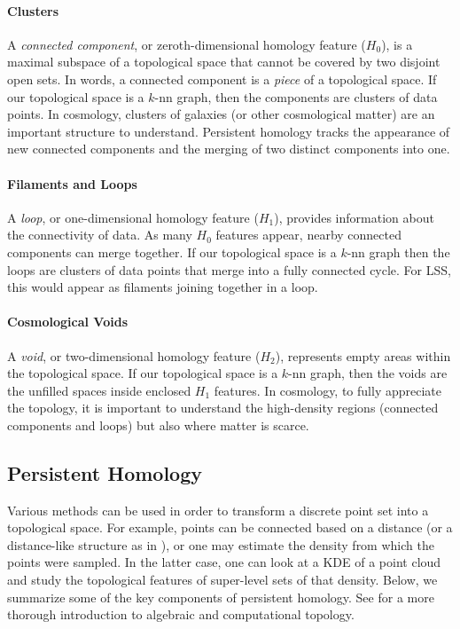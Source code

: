 \documentclass[12pt]{article}
\begin{document}
\paragraph{Clusters}
A \emph{connected component}, or zeroth-dimensional homology feature ($H_0$), is a maximal subspace of a topological
space that cannot be covered by two disjoint open sets. In words, a connected component is a \textit{piece} of a topological space.  If our topological space is a
$k$-nn graph, then the components are clusters of data points.  In cosmology, clusters of galaxies (or other cosmological matter) are an important
structure to understand. Persistent homology tracks the appearance of new connected components and the merging of two distinct components into one.

\paragraph{Filaments and Loops} A \emph{loop}, or one-dimensional homology feature ($H_1$), provides information about the connectivity of data. As many $H_0$ features appear, nearby connected components can merge together. If our topological space is a $k$-nn graph then the loops are clusters of data points that merge into a fully connected cycle.  For LSS, this would appear as filaments joining together in a loop.


\paragraph{Cosmological Voids}  A \emph{void}, or two-dimensional homology feature ($H_2$), represents empty areas within the topological space. If our topological space is a $k$-nn graph, then the voids are the unfilled spaces inside enclosed $H_1$ features.  In cosmology, to fully appreciate the topology, it is important to understand the high-density regions (connected components and loops) but also where matter is scarce.

\subsection{Persistent Homology}
Various methods can be used in order to transform a discrete point set into a topological space. For example, points can be connected based on a distance (or
a distance-like structure as in \citep{chazal2011geometric}), or one may estimate the density from which the points were sampled.
In the latter case, one can look at a KDE of a point cloud and study the topological features of super-level sets of that density. Below, we summarize some of the key components of persistent homology. See \citep{edelsbrunner2010computational,hatcher2002algebraic,munkres1984elements} for a more thorough introduction to algebraic and computational topology.
\end{document}
